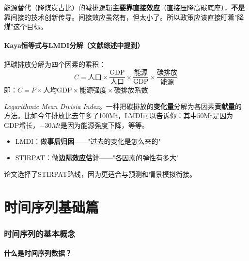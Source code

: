 \documentclass[12pt, a4paper]{article}
\begin{document}
\begin{tipbox}[中介分析的核心结论]
能源替代（降煤炭占比）的减排逻辑\textbf{主要靠直接效应}（直接压降高碳底座），\textbf{不是}靠间接的技术创新传导。间接效应虽然有，但太小了。所以政策应该直接盯着"降煤"这个目标。
\end{tipbox}

\subsection{Kaya恒等式与LMDI分解（文献综述中提到）}

\begin{conceptbox}[Kaya恒等式]
把碳排放分解为四个因素的乘积：
\[
C = \text{人口} \times \frac{\text{GDP}}{\text{人口}} \times \frac{\text{能源}}{\text{GDP}} \times \frac{\text{碳排放}}{\text{能源}}
\]
即：$C = P \times \text{人均GDP} \times \text{能源强度} \times \text{碳排放系数}$ \end{conceptbox}

\begin{conceptbox}[LMDI分解]
\textit{Logarithmic Mean Divisia Index}。一种把碳排放的\textbf{变化量}分解为各因素\textbf{贡献量}的方法。比如今年排放比去年多了100Mt，LMDI可以告诉你：其中50Mt是因为GDP增长，$-30Mt$是因为能源强度下降，等等。
\end{conceptbox}

\begin{tipbox}
\begin{itemize}[leftmargin=2em]
\item LMDI：做\textbf{事后归因}——"过去的变化是怎么来的"
\item STIRPAT：做\textbf{边际效应估计}——"各因素的弹性有多大"
\end{itemize}
论文选择了STIRPAT路线，因为更适合与预测和情景模拟衔接。
\end{tipbox}

\part{时间序列基础篇}

\section{时间序列的基本概念}

\subsection{什么是时间序列数据？}
\end{document}
